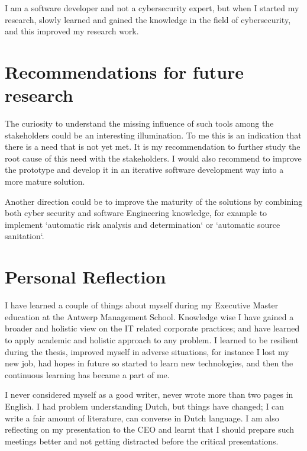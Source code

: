 I am a software developer and not a cybersecurity expert,
but when I started my research, slowly learned and gained the knowledge in the field of cybersecurity, 
 and this improved my research work.



\section{Recommendations for future research}
\label{Future Recommendations}


The curiosity to understand the missing influence of such tools among the stakeholders could be an interesting illumination.
To me this is an indication that there is a need that is not yet met. 
It is my recommendation to further study the root cause of this need
with the stakeholders.
I  would also recommend to improve the prototype 
and develop it in an iterative software development way into a more mature solution.

Another direction could be to improve the maturity of the solutions 
by combining both cyber security and software Engineering knowledge, for example to implement `automatic risk analysis and determination` or `automatic source sanitation`.
 

\section{Personal Reflection}


I have learned a couple of things about myself during my
Executive Master education at the Antwerp Management School. 
Knowledge wise I have gained a broader and holistic view on the IT related corporate practices; 
and have learned to apply academic and holistic approach to any problem. 
I learned to be resilient during the thesis, 
improved myself in adverse situations, 
for instance I lost my new job, had hopes in future so started to learn new technologies, and then the continuous learning has became a part of me.

I never considered myself as a good writer, 
never wrote more than two pages in English. 
I had problem understanding Dutch, but things have changed; I can write a fair amount of literature, can converse in Dutch language. 
I am also reflecting on my presentation to the CEO and learnt that I should prepare such meetings better and not getting distracted before the critical presentations.

